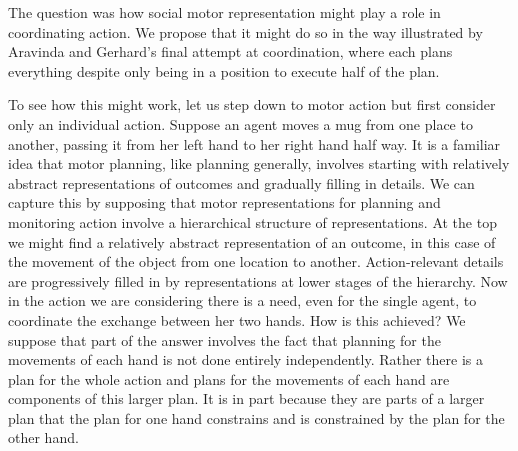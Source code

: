 \documentclass[12pt,\papersize]{extarticle}
\begin{document}
The question was how social motor representation might play a role in coordinating action.
We propose that it might do so in the way illustrated by Aravinda and Gerhard's final attempt at coordination,
where each plans everything despite only being in a position to execute half of the plan.






To see how this might work,
let us step down to motor action but first consider only  an individual action.
Suppose an agent moves a mug from one place to another, passing it from her left hand to her right hand half way.
It is a familiar idea that motor planning, like planning generally, involves starting with relatively abstract representations of outcomes and gradually filling in details.
We can capture this by supposing that 
motor representations for planning and monitoring action involve a hierarchical structure of representations.
At the top we might find a relatively abstract representation of an outcome, in this case of the movement of the object from one location to another.
Action-relevant details are progressively filled in by representations at lower stages of the hierarchy. 
Now in the action we are considering there is a need, even for the single agent, to coordinate the exchange between her two hands.
How is this achieved? 
We suppose that part of the answer involves the fact that planning for the movements of each hand is not done entirely independently.
Rather there is a plan for the whole action
and plans for the movements of each hand are components of this larger plan.
It is in part because they are parts of a larger plan that the plan for one hand constrains and is constrained by the plan for the other hand.
\end{document}
